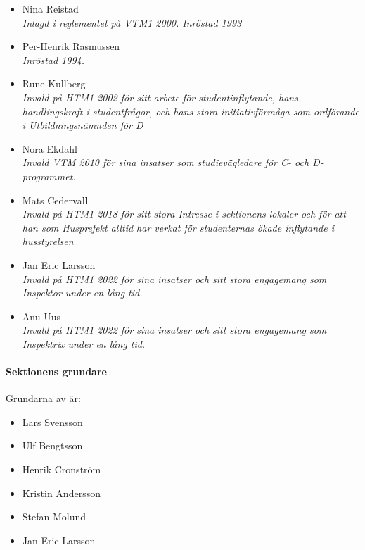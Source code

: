 \documentclass{dsekregulations}
\begin{document}
\begin{itemize}
\item Nina Reistad \\
  \emph{Inlagd i reglementet på VTM1 2000. Inröstad 1993}
\item Per-Henrik Rasmussen \\ \emph{Inröstad 1994.}
\item Rune Kullberg \\
  \emph{Invald på HTM1 2002 för sitt arbete för studentinflytande, hans
  handlingskraft i studentfrågor, och hans stora initiativförmåga som
  ordförande i Utbildningsnämnden för D}
\item Nora Ekdahl \\
  \emph{Invald VTM 2010 för sina insatser som studievägledare för C- och
  D-programmet.}
\item Mats Cedervall \\
  \emph{Invald på HTM1 2018 för sitt stora Intresse i sektionens lokaler och
  för att han som Husprefekt alltid har verkat för studenternas ökade
  inflytande i husstyrelsen}
\item Jan Eric Larsson \\
  \emph{Invald på HTM1 2022 för sina insatser och sitt stora engagemang som
  Inspektor under en lång tid.}
\item Anu Uus \\
  \emph{Invald på HTM1 2022 för sina insatser och sitt stora engagemang som
  Inspektrix under en lång tid.}
\end{itemize}

\paragraph{Sektionens grundare}
Grundarna av \Dseklongname{} är:
\begin{itemize}
\item Lars Svensson
\item Ulf Bengtsson
\item Henrik Cronström
\item Kristin Andersson
\item Stefan Molund
\item Jan Eric Larsson
\end{itemize}
\end{document}
